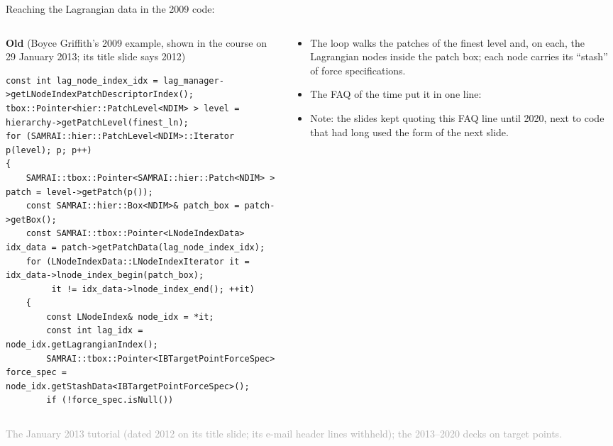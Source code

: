 \documentclass[aspectratio=169,11pt]{beamer}
\newcommand{\sourcecredit}[1]{\vfill\begin{flushright}\tiny\textcolor{DarkGray}{#1}\end{flushright}}
\begin{document}
\begin{frame}[fragile]{Reaching the Lagrangian data in the 2009 code: }
\label{fr:stash}
\begin{columns}[T,onlytextwidth]
\begin{column}{0.6\textwidth}
\textbf{Old} (Boyce Griffith's 2009  example, shown in the course on 29 January 2013; its title slide says 2012)
\begin{lstlisting}[style=cpptiny]
const int lag_node_index_idx = lag_manager->getLNodeIndexPatchDescriptorIndex();
tbox::Pointer<hier::PatchLevel<NDIM> > level = hierarchy->getPatchLevel(finest_ln);
for (SAMRAI::hier::PatchLevel<NDIM>::Iterator p(level); p; p++)
{
    SAMRAI::tbox::Pointer<SAMRAI::hier::Patch<NDIM> > patch = level->getPatch(p());
    const SAMRAI::hier::Box<NDIM>& patch_box = patch->getBox();
    const SAMRAI::tbox::Pointer<LNodeIndexData> idx_data = patch->getPatchData(lag_node_index_idx);
    for (LNodeIndexData::LNodeIndexIterator it = idx_data->lnode_index_begin(patch_box);
         it != idx_data->lnode_index_end(); ++it)
    {
        const LNodeIndex& node_idx = *it;
        const int lag_idx = node_idx.getLagrangianIndex();
        SAMRAI::tbox::Pointer<IBTargetPointForceSpec> force_spec = node_idx.getStashData<IBTargetPointForceSpec>();
        if (!force_spec.isNull())
\end{lstlisting}
\end{column}
\begin{column}{0.38\textwidth}
\footnotesize
\begin{itemize}\setlength{\itemsep}{2pt}
  \item The loop walks the patches of the finest level and, on each, the Lagrangian nodes inside the patch box; each node carries its ``stash'' of force specifications.
  \item The FAQ of the time put it in one line: 
  \item Note: the slides kept quoting this FAQ line until 2020, next to code that had long used the form of the next slide.
\end{itemize}
\end{column}
\end{columns}
\sourcecredit{The January 2013 tutorial (dated 2012 on its title slide; its e-mail header lines withheld); the 2013--2020 decks on target points.}
\end{frame}
\end{document}
